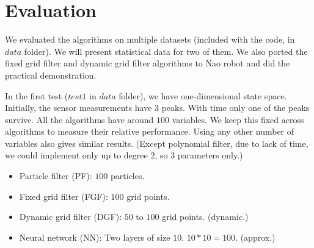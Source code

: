 \section{Evaluation}
We evaluated the algorithms on multiple datasets (included with the code, in $data$ folder). We will present statistical data for two of them. We also ported the fixed grid filter and dynamic grid filter algorithms to Nao robot and did the practical demonstration.

In the first test ($test1$ in $data$ folder), we have one-dimensional state space. Initially, the sensor measurements have $3$ peaks. With time only one of the peaks survive. All the algorithms have around $100$ variables. We keep this fixed across algorithms to measure their relative performance. Using any other number of variables also gives similar results. (Except polynomial filter, due to lack of time, we could implement only up to degree $2$, so $3$ parameters only.)
\begin{itemize}
    \item Particle filter (PF): $100$ particles.
    \item Fixed grid filter (FGF): $100$ grid points.
    \item Dynamic grid filter (DGF): $50$ to $100$ grid points. (dynamic.)
    \item Neural network (NN): Two layers of size $10$. $10*10=100$. (approx.)
\end{itemize}

\begin{table}
\caption{Error in the state with maximum probability.}    
\begin{center}
\end{center}
\end{table}

